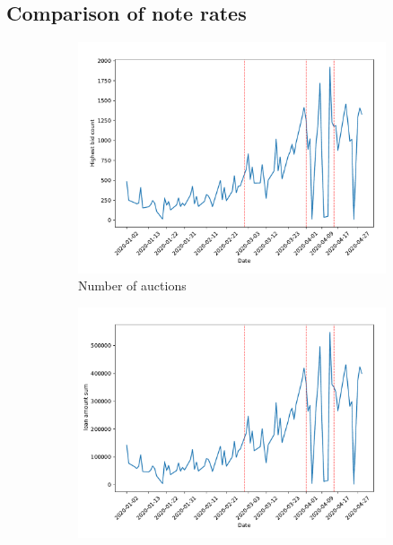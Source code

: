 \documentclass[11pt,a4paper]{article}
\begin{document}
\pagebreak
\subsection{Comparison of note rates}

\begin{figure}[h]
  \centering
  \begin{subfigure}[b]{0.49\textwidth}
      \includegraphics[width=0.998\textwidth]{../results/figures/winner_bid_count_mat30_loan1_timeseries_nr_3_3.75.pdf}
      \caption{ Number of auctions}
     \end{subfigure}
     \begin{subfigure}[b]{0.49\textwidth}
      \includegraphics[width=0.998\textwidth]{../results/figures/LoanAmount_sum_mat30_loan1_timeseries_nr_3_3.75.pdf}

\end{subfigure}
\end{figure}
\end{document}
